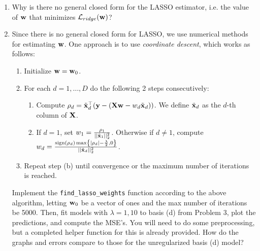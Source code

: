 \documentclass[submit]{../harvardml}
\begin{document}
\begin{problem}
\begin{enumerate}
    \item Why is there no general closed form for the LASSO estimator, i.e. the value of $\mathbf{w}$ that minimizes $\mathcal{L}_{ridge}(\mathbf{w})$?

    \item Since there is no general closed form for LASSO, we use numerical methods for estimating $\mathbf{w}$. One approach is to use \textit{coordinate descent}, which works as follows: 
    \begin{enumerate}
        \item Initialize $\mathbf{w}=\mathbf{w}_0$.
        \item For each $d=1, \ldots, D$ do the following 2 steps consecutively:
        \begin{enumerate}
            \item Compute $\rho_d = \tilde{\mathbf{x}}_d^\top(\mathbf{y} - (\mathbf{X} \mathbf{w} - w_d \tilde{\mathbf{x}}_d))$. We define $\tilde{\mathbf{x}}_d$ as the $d$-th column of $\mathbf{X}$.

            \item If $d=1$, set $w_1 = \frac{\rho_1}{||\tilde{\mathbf{x}}_1||^2_2}$. Otherwise if $d\ne 1$, compute $w_d = \frac{\text{sign}(\rho_d)\max\left\{|\rho_d|-\frac{\lambda}{2}, 0\right\}}{||\tilde{\mathbf{x}}_d||^2_2}$.
        \end{enumerate}
        \item Repeat step (b) until convergence or the maximum number of iterations is reached.
    \end{enumerate} 

    Implement the \texttt{find\_lasso\_weights} function according to the above algorithm, letting $\mathbf{w}_0$ be a vector of ones and the max number of iterations be 5000. Then, fit models with $\lambda=1, 10$ to basis (d) from Problem 3, plot the predictions, and compute the MSE's. You will need to do some preprocessing, but a completed helper function for this is already provided. How do the graphs and errors compare to those for the unregularized basis (d) model? 


\end{enumerate}

\end{problem}
\end{document}
